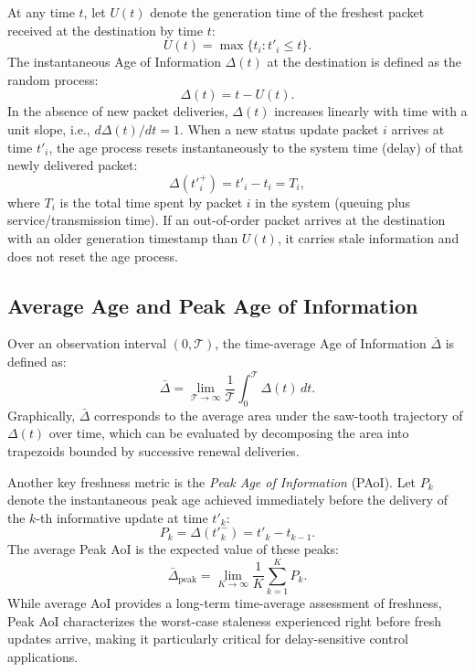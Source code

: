 At any time $t$, let $U(t)$ denote the generation time of the freshest packet received at the destination by time $t$:
\begin{equation}
    U(t) = \max \{ t_i : t'_i \le t \}.
\end{equation}
The instantaneous Age of Information $\Delta(t)$ at the destination is defined as the random process:
\begin{equation}
    \Delta(t) = t - U(t).
\end{equation}
In the absence of new packet deliveries, $\Delta(t)$ increases linearly with time with a unit slope, i.e., $d\Delta(t)/dt = 1$. When a new status update packet $i$ arrives at time $t'_i$, the age process resets instantaneously to the system time (delay) of that newly delivered packet:
\begin{equation}
    \Delta(t'^+_i) = t'_i - t_i = T_i,
\end{equation}
where $T_i$ is the total time spent by packet $i$ in the system (queuing plus service/transmission time). If an out-of-order packet arrives at the destination with an older generation timestamp than $U(t)$, it carries stale information and does not reset the age process.

\subsection{Average Age and Peak Age of Information}
Over an observation interval $(0, \mathcal{T})$, the time-average Age of Information $\bar{\Delta}$ is defined as:
\begin{equation}
    \bar{\Delta} = \lim_{\mathcal{T} \to \infty} \frac{1}{\mathcal{T}} \int_0^{\mathcal{T}} \Delta(t) \, dt.
\end{equation}
Graphically, $\bar{\Delta}$ corresponds to the average area under the saw-tooth trajectory of $\Delta(t)$ over time, which can be evaluated by decomposing the area into trapezoids bounded by successive renewal deliveries.

Another key freshness metric is the \emph{Peak Age of Information} (PAoI). Let $P_k$ denote the instantaneous peak age achieved immediately before the delivery of the $k$-th informative update at time $t'_k$:
\begin{equation}
    P_k = \Delta(t'^-_k) = t'_k - t_{k-1}.
\end{equation}
The average Peak AoI is the expected value of these peaks:
\begin{equation}
    \bar{\Delta}_{\text{peak}} = \lim_{K \to \infty} \frac{1}{K} \sum_{k=1}^K P_k.
\end{equation}
While average AoI provides a long-term time-average assessment of freshness, Peak AoI characterizes the worst-case staleness experienced right before fresh updates arrive, making it particularly critical for delay-sensitive control applications.

